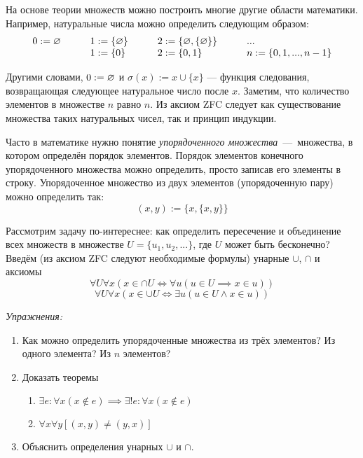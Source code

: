 На основе теории множеств можно построить многие другие области математики.
Например, натуральные числа можно определить следующим образом:
\[ \begin{array}{llll}
		0 :=\varnothing\qquad & 1  :=\{\varnothing\}\qquad & 2  :=\{\varnothing,\{\varnothing\}\}\qquad & ... \\
		                & 1:=\{0\}\qquad       & 2:=\{0,1\}
		                & n:=\{0,1,...,n-1\}
	\end{array}
\]

Другими словами, ${0:=\varnothing}$ и $\sigma(x):=x\cup \{x\}$ --- функция следования,
возвращающая следующее натуральное число после $x$. Заметим, что количество элементов
в множестве $n$ равно $n$. Из аксиом ZFC следует как существование множества таких
натуральных чисел, так и принцип индукции.

Часто в математике нужно понятие {\it упорядоченного множества}~---~множества,
в котором определён порядок элементов. Порядок элементов
конечного упорядоченного множества можно
определить, просто записав его элементы в строку.
Упорядоченное множество из двух элементов (упорядоченную пару)
можно определить так:
\[
	(x,y):=\{x,\{x,y\}\}
\]

Рассмотрим задачу по-интереснее: как определить пересечение и объединение
всех множеств в множестве $U=\{u_1,u_2,...\}$, где $U$ может быть бесконечно?
Введём (из аксиом ZFC следуют необходимые формулы) унарные $\cup$, $\cap$
и аксиомы
\[
	\forall U\forall x(x\in \cap U\iff \forall u(u\in U\implies x\in u))
\]
\[
	\forall U\forall x(x\in \cup U\iff \exists u(u\in U\land x\in u))
\]

\vspace{1em}
{\it Упражнения:}
\begin{enumerate}
	\item{}Как можно определить упорядоченные множества из трёх элементов?
	Из одного элемента? Из $n$ элементов?

	\item{}Доказать теоремы
	\begin{enumerate}
		\item{}${\exists e:\forall x(x\notin e)\implies
					\exists!e:\forall x(x\notin e)}$ \label{ex:eset_only}
		\item{}$\forall x\forall y[(x,y)\neq (y,x)]$
	\end{enumerate}
	\item{}Объяснить определения унарных $\cup$ и $\cap$.
\end{enumerate}

\pagebreak

